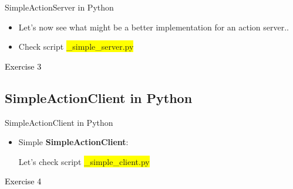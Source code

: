 \documentclass{beamer}
\begin{document}
\begin{frame}{SimpleActionServer in Python}
    
    \begin{itemize} 
        
        \item Let's now see what might be a better implementation for an action server..
        \vspace{7mm}
        \item Check script {\colorbox{yellow}{\_simple\_server.py}}
    \end{itemize}      
\end{frame}



\begin{frame}[plain]{}  
    \centering
    {\huge \textcolor{black}{Exercise 3}}
\end{frame}


\subsection{SimpleActionClient  in Python}

\begin{frame}{SimpleActionClient in Python}
    
    \begin{itemize} 
        
        \item Simple \textbf{SimpleActionClient}:
        \vspace{7mm}
        
        Let's check script {\colorbox{yellow}{\_simple\_client.py}}
    \end{itemize}      
\end{frame}


\begin{frame}[plain]{}  
    \centering
    {\huge \textcolor{black}{Exercise 4}}
\end{frame}
\end{document}
